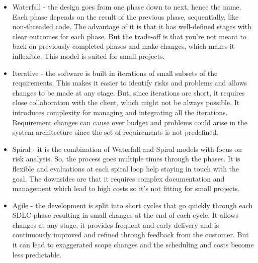 \begin{itemize}
    \item Waterfall - the design goes from one phase down to next, hence the name. Each phase depends on the result of the previous phase, sequentially, like non-threaded code. The advantage of it is that it has well-defined stages with clear outcomes for each phase. But the trade-off is that you're not meant to back on previously completed phases and make changes, which makes it inflexible. This model is suited for small projects.
    \item Iterative - the software is built in iterations of small subsets of the requirements. This makes it easier to identify risks and problems and allows changes to be made at any stage. But, since iterations are short, it requires close collaboration with the client, which might not be always possible. It introduces complexity for managing and integrating all the iterations. Requirement changes can cause over budget and problems could arise in the system architecture since the set of requirements is not predefined.
    \item Spiral - it is the combination of Waterfall and Spiral models with focus on risk analysis. So, the process goes multiple times through the phases. It is flexible and evaluations at each spiral loop help staying in touch with the goal. The downsides are that it requires complex documentation and management which lead to high costs so it's not fitting for small projects.
    \item Agile - the development is split into short cycles that go quickly through each SDLC phase resulting in small changes at the end of each cycle. It allows changes at any stage, it provides frequent and early delivery and is continuously improved and refined through feedback from the customer. But it can lead to exaggerated scope changes and the scheduling and costs become less predictable. \cite{sdlc}
\end{itemize}

